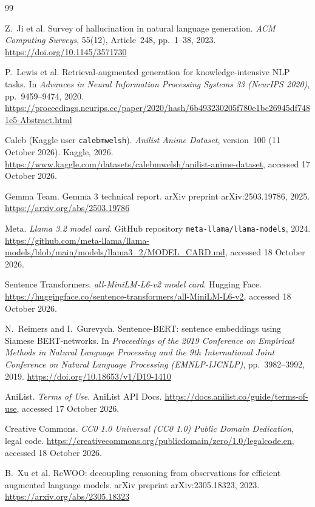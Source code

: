 \documentclass[a4paper,10pt]{article}
\begin{document}
\begin{thebibliography}{99}


	 Z.~Ji et al. Survey of hallucination in natural language generation. \emph{ACM Computing Surveys}, 55(12), Article~248, pp.~1--38, 2023. \url{https://doi.org/10.1145/3571730}

	 P.~Lewis et al. Retrieval-augmented generation for knowledge-intensive NLP tasks. In \emph{Advances in Neural Information Processing Systems 33 (NeurIPS 2020)}, pp.~9459--9474, 2020. \url{https://proceedings.neurips.cc/paper/2020/hash/6b493230205f780e1bc26945df7481e5-Abstract.html}

	 Caleb (Kaggle user \texttt{calebmwelsh}). \emph{Anilist Anime Dataset}, version~100 (11 October 2026). Kaggle, 2026. \url{https://www.kaggle.com/datasets/calebmwelsh/anilist-anime-dataset}, accessed 17 October 2026.

	 Gemma Team. Gemma 3 technical report. arXiv preprint arXiv:2503.19786, 2025. \url{https://arxiv.org/abs/2503.19786}

	 Meta. \emph{Llama 3.2 model card}. GitHub repository \texttt{meta-llama/llama-models}, 2024. \url{https://github.com/meta-llama/llama-models/blob/main/models/llama3_2/MODEL_CARD.md}, accessed 18 October 2026.

	 Sentence Transformers. \emph{all-MiniLM-L6-v2 model card}. Hugging Face. \url{https://huggingface.co/sentence-transformers/all-MiniLM-L6-v2}, accessed 18 October 2026.

	 N.~Reimers and I.~Gurevych. Sentence-BERT: sentence embeddings using Siamese BERT-networks. In \emph{Proceedings of the 2019 Conference on Empirical Methods in Natural Language Processing and the 9th International Joint Conference on Natural Language Processing (EMNLP-IJCNLP)}, pp.~3982--3992, 2019. \url{https://doi.org/10.18653/v1/D19-1410}

	 AniList. \emph{Terms of Use}. AniList API Docs. \url{https://docs.anilist.co/guide/terms-of-use}, accessed 17 October 2026.

	 Creative Commons. \emph{CC0 1.0 Universal (CC0 1.0) Public Domain Dedication}, legal code. \url{https://creativecommons.org/publicdomain/zero/1.0/legalcode.en}, accessed 18 October 2026.

	 B.~Xu et al. ReWOO: decoupling reasoning from observations for efficient augmented language models. arXiv preprint arXiv:2305.18323, 2023. \url{https://arxiv.org/abs/2305.18323}


\end{thebibliography}
\end{document}
